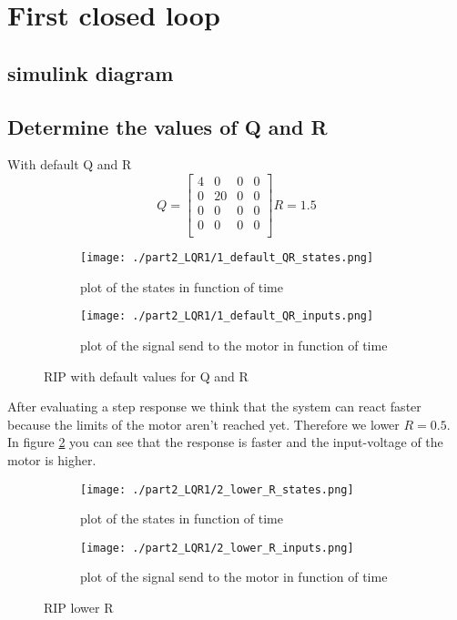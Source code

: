 \section{First closed loop}
\subsection{simulink diagram}


\subsection{Determine the values of Q and R}
With default Q and R
$$
Q=\begin{bmatrix}
4 & 0 & 0 & 0 \\
0 & 20 & 0 & 0 \\
0 & 0 & 0 & 0 \\
0 & 0 & 0 & 0 \\
\end{bmatrix}
R=1.5
$$
\begin{figure}[H]
	\centering
	\begin{subfigure}[b]{0.45\textwidth}
		\texttt{[image: ./part2\_LQR1/1\_default\_QR\_states.png]}
		\caption{plot of the states in function of time}
	\end{subfigure}
	\begin{subfigure}[b]{0.45\textwidth}
		\texttt{[image: ./part2\_LQR1/1\_default\_QR\_inputs.png]}
		\caption{plot of the signal send to the motor in function of time}
	\end{subfigure}
	\caption{RIP with default values for Q and R}
	\label{fig:default}
\end{figure}

After evaluating a step response we think that the system can react faster because the limits of the motor aren't reached yet. Therefore we lower $ R = 0.5$. In figure \ref{fig:lowR} you can see that the response is faster and the input-voltage of the motor is higher.

\begin{figure}[H]
	\centering
	\begin{subfigure}[b]{0.45\textwidth}
		\texttt{[image: ./part2\_LQR1/2\_lower\_R\_states.png]}
		\caption{plot of the states in function of time}
	\end{subfigure}
	\begin{subfigure}[b]{0.45\textwidth}
		\texttt{[image: ./part2\_LQR1/2\_lower\_R\_inputs.png]}
		\caption{plot of the signal send to the motor in function of time}
	\end{subfigure}
	\caption{RIP lower R}
	\label{fig:lowR}
\end{figure}

